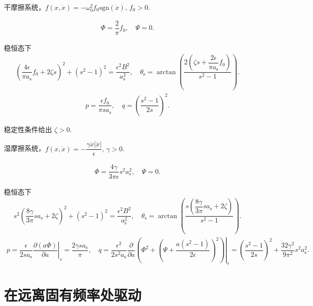 \begin{exbox}
	干摩擦系统，\(f(x, \dot{x}) = -\omega_0^2 f_0 \text{sgn}(\dot{x}),\,f_0 > 0\).

	\begin{align*}
		\Phi = \dfrac{2}{\pi} f_0, \quad \Psi = 0.
	\end{align*}

	稳恒态下
	\begin{align*}
		\left( \dfrac{4 \epsilon}{\pi a_{\mathrm{s}}} f_0 + 2 \zeta s \right)^2 + (s^2 - 1)^2 = \dfrac{\epsilon^2 B^2}{a_{\mathrm{s}}^2}, \quad \theta_{\mathrm{s}} = \arctan\left( \dfrac{2 \left( \zeta s + \dfrac{2 \epsilon}{\pi a_{\mathrm{s}}} f_0 \right)}{s^2 - 1} \right).
	\end{align*}
	\begin{align*}
		p = \dfrac{\epsilon f_0}{\pi s a_{\mathrm{s}}}, \quad q = \left( \dfrac{s^2 - 1}{2 s} \right)^2.
	\end{align*}

	稳定性条件给出 \(\zeta > 0\).
\end{exbox}

\begin{exbox}
	湿摩擦系统，\(f(x, \dot{x}) = -\dfrac{\gamma \dot{x} |\dot{x}|}{\epsilon},\,\gamma > 0\).

	\begin{align*}
		\Phi = \dfrac{4 \gamma}{3 \pi \epsilon} s^2 a_{\mathrm{s}}^2, \quad \Psi = 0.
	\end{align*}

	稳恒态下
	\begin{align*}
		s^2 \left( \dfrac{8 \gamma}{3 \pi} s a_{\mathrm{s}} + 2 \zeta \right)^2 + (s^2 - 1)^2 = \dfrac{\epsilon^2 B^2}{a_{\mathrm{s}}^2}, \quad \theta_{\mathrm{s}} = \arctan\left( \dfrac{s \left( \dfrac{8 \gamma}{3 \pi} s a_{\mathrm{s}} + 2 \zeta \right)}{s^2 - 1} \right).
	\end{align*}
	\begin{align*}
		p = \left. \dfrac{\epsilon}{2 s a_{\mathrm{s}}} \dfrac{\partial (a \Phi)}{\partial a} \right|_s = \dfrac{2 \gamma s a_{\mathrm{s}}}{\pi},\quad
		q = \dfrac{\epsilon^2}{2 s^2 a_{\mathrm{s}}} \left. \dfrac{\partial}{\partial a} \left( \Phi^2 + \left( \Psi + \dfrac{a (s^2 - 1)}{2 \epsilon} \right)^2 \right) \right|_s = \left( \dfrac{s^2 - 1}{2 s} \right)^2 + \dfrac{32 \gamma^2}{9 \pi^2} s^2 a_{\mathrm{s}}^2.
	\end{align*}
\end{exbox}

\section{在远离固有频率处驱动}


